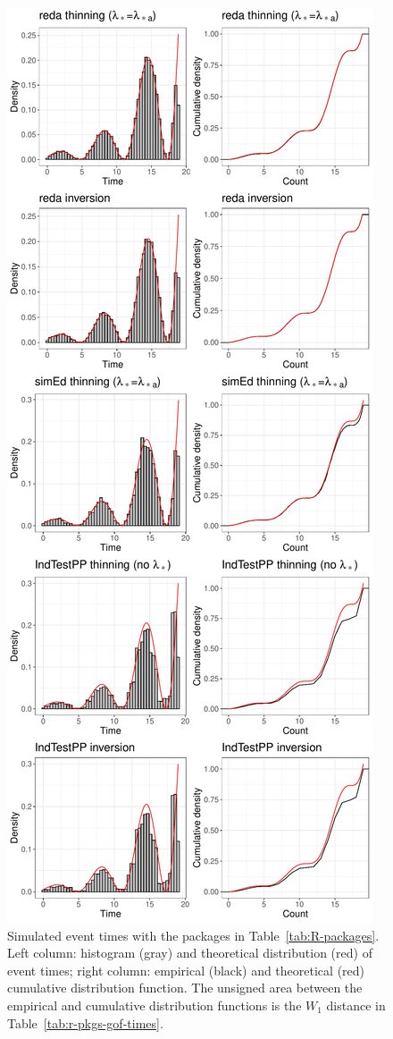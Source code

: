 \documentclass[article]{jss}\usepackage[]{graphicx}\usepackage[]{xcolor}
\makeatletter
\def\maxwidth{ %
  \ifdim\Gin@nat@width>\linewidth
    \linewidth
  \else
    \Gin@nat@width
  \fi
}
\makeatother
\begin{document}
\begin{Schunk}
\begin{figure}

{\centering \includegraphics[width=\maxwidth,height=\textheight,keepaspectratio=true]{figure/epdf-r-pkgs-times-1} 

}

\caption{Simulated event times with the  packages in Table~\ref{tab:R-packages}. Left column: histogram (gray) and theoretical distribution (red) of event times; right column: empirical (black) and theoretical (red) cumulative distribution function. The unsigned area between the empirical and cumulative distribution functions is the $W_1$ distance in Table~\ref{tab:r-pkgs-gof-times}.}\label{fig:epdf-r-pkgs-times}
\end{figure}
\end{Schunk}
\end{document}
